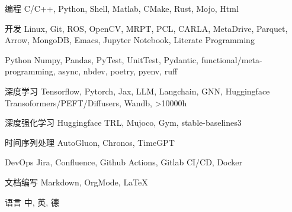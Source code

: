 \documentclass[../cv_cn.tex]{subfiles}
\begin{document}


\begin{cvskills}

  \cvskill
    {编程} %
    {C/C++, Python, Shell, Matlab, CMake, Rust, Mojo, Html} %

  \cvskill
    {开发} %
    {Linux, Git, ROS, OpenCV, MRPT, PCL, CARLA, MetaDrive, Parquet, Arrow, MongoDB, Emacs, Jupyter Notebook, Literate Programming} %

  \cvskill
    {Python} %
    {Numpy, Pandas, PyTest, UnitTest, Pydantic, functional/meta-programming, async, nbdev, poetry, pyenv, ruff} %

  \cvskill
    {深度学习} %
    {Tensorflow, Pytorch, Jax, LLM, Langchain, GNN, Huggingface Transoformers/PEFT/Diffusers, Wandb, >10000h} %

  \cvskill
    {深度强化学习} %
    {Huggingface TRL, Mujoco, Gym, stable-baselines3} %

  \cvskill
    {时间序列处理} %
    {AutoGluon, Chronos, TimeGPT} %

  \cvskill
    {DevOps} %
    {Jira, Confluence, Github Actions, Gitlab CI/CD, Docker} %

  \cvskill
    {文档编写} %
    {Markdown, OrgMode, LaTeX} %

  \cvskill
    {语言} %
    {中, 英, 德} %

\end{cvskills}
\end{document}

